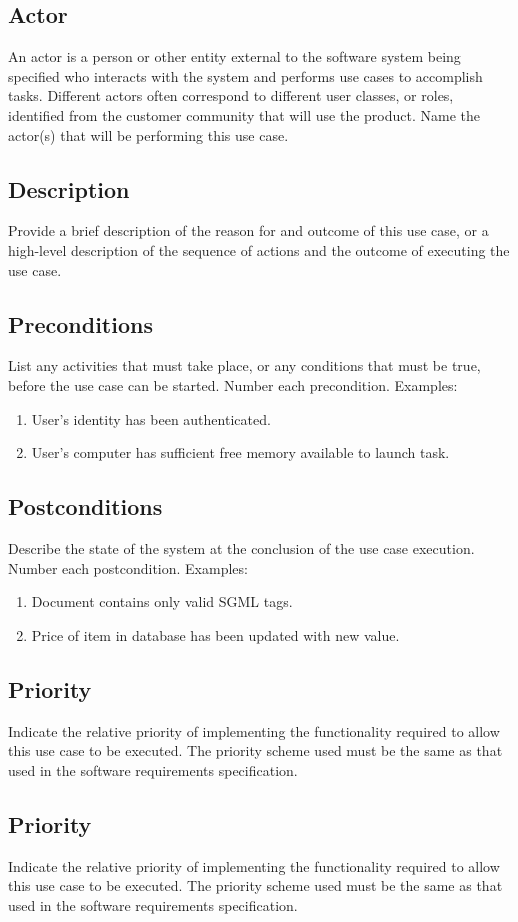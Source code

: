 \documentclass[a4paper]{article}
\begin{document}
\subsection{Actor}
An actor is a person or other entity external to the software system being specified who interacts with the system and performs use cases to accomplish tasks. Different actors often correspond to different user classes, or roles, identified from the customer community that will use the product. Name the actor(s) that will be performing this use case.
\subsection{Description}
Provide a brief description of the reason for and outcome of this use case, or a high-level description of the sequence of actions and the outcome of executing the use case.
\subsection{Preconditions}
List any activities that must take place, or any conditions that must be true, before the use case can be started. Number each precondition. Examples:
\begin{enumerate}
	\item User’s identity has been authenticated.
	\item User’s computer has sufficient free memory available to launch task.
\end{enumerate}
\subsection{Postconditions}
Describe the state of the system at the conclusion of the use case execution. Number each postcondition. Examples:
\begin{enumerate}
	\item Document contains only valid SGML tags.
	\item Price of item in database has been updated with new value.
\end{enumerate}
\subsection{Priority}
Indicate the relative priority of implementing the functionality required to allow this use case to be executed. The priority scheme used must be the same as that used in the software requirements specification.
\subsection{Priority}
Indicate the relative priority of implementing the functionality required to allow this use case to be executed. The priority scheme used must be the same as that used in the software requirements specification.
\end{document}
